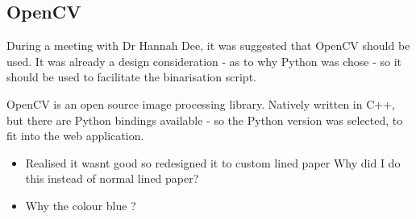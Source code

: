 \subsection{OpenCV}
During a meeting with Dr Hannah Dee, it was suggested that OpenCV should be used. It was already a design consideration - as to why Python was chose - so it should be used to facilitate the binarisation script.

OpenCV is an open source image processing library. Natively written in C++, but there are Python bindings available - so the Python version was selected, to fit into the web application.





\begin{itemize}
  \item Realised it wasnt good so redesigned it to custom lined paper Why did I do this instead of normal lined paper?
  \item Why the colour blue ?
\end{itemize}
